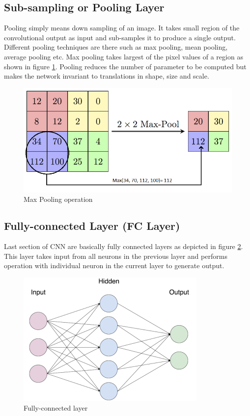 \documentclass[conference]{IEEEtran}
\begin{document}
\subsection{Sub-sampling or Pooling Layer}
Pooling simply means down sampling of an image. It takes small region of the convolutional output as input and sub-samples it to produce a single output. Different pooling techniques are there such as max pooling, mean pooling, average pooling etc. Max pooling takes largest of the pixel values of a region as shown in figure \ref{fmax_pool}. Pooling reduces the number of parameter to be computed but makes the network invariant to translations in shape, size and scale.     
\begin{figure}[htb]
	\centering
	\includegraphics[scale=0.2 ]{image/max_pool}
	\caption{Max Pooling operation}
	\label{fmax_pool}
\end{figure}

\subsection{Fully-connected Layer (FC Layer)}
Last section of CNN are basically fully connected layers as depicted in figure \ref{ffclayer}. This layer takes input from all neurons in the previous layer and performs operation with individual neuron in the current layer to generate output. 

\begin{figure}[htb]
	\centering
	\includegraphics[scale=0.3 ]{image/fclayer}
	\caption{Fully-connected layer}
	\label{ffclayer}
\end{figure}
\end{document}
